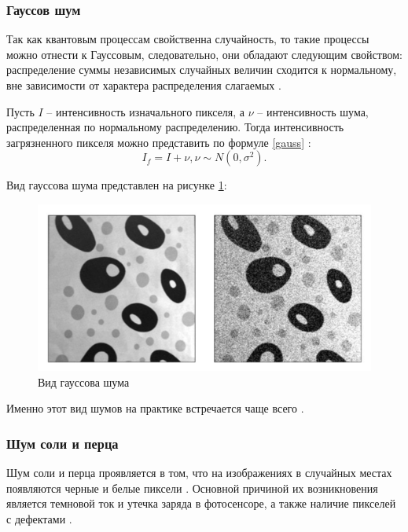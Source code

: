 \subsubsection{Гауссов шум}
Так как квантовым процессам свойственна случайность, то такие процессы можно отнести к Гауссовым, следовательно, они обладают следующим свойством: распределение суммы независимых случайных величин сходится к нормальному, вне зависимости от характера распределения слагаемых \cite{inproceedings}.

Пусть $I$ -- интенсивность изначального пикселя, а $\nu$ -- интенсивность шума, распределенная по нормальному распределению. 
Тогда интенсивность загрязненного пикселя можно представить по формуле \eqref{gauss} \cite{filterTechincs}: 
\begin{equation}
	\label{gauss}
I_f = I + \nu,  \nu \sim N(0, \sigma^2).
\end{equation}


Вид гауссова шума представлен на рисунке \ref{fig::gaussSh}:
\FloatBarrier
\begin{figure}[h]	
	\begin{center}
		\includegraphics[width=\linewidth]{inc/png/gaussShum.png}
	\end{center}
	\captionsetup{justification=centering}
	\caption{Вид гауссова шума}
	\label{fig::gaussSh}
\end{figure}
\FloatBarrier

Именно этот вид шумов на практике встречается чаще всего \cite{filterTechincs}. 

\subsubsection{Шум соли и перца}
Шум соли и перца проявляется в том, что на изображениях в случайных местах появляются черные и белые пиксели \cite{moments}.
Основной причиной их возникновения является темновой ток и утечка заряда в фотосенсоре, а также наличие пикселей с дефектами \cite{shum}.

